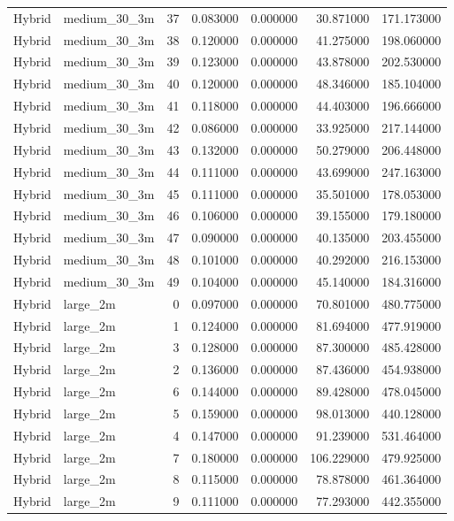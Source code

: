 \begin{tabular}{llrrrrr}
Hybrid & medium_30_3m & 37 & 0.083000 & 0.000000 & 30.871000 & 171.173000 \\
Hybrid & medium_30_3m & 38 & 0.120000 & 0.000000 & 41.275000 & 198.060000 \\
Hybrid & medium_30_3m & 39 & 0.123000 & 0.000000 & 43.878000 & 202.530000 \\
Hybrid & medium_30_3m & 40 & 0.120000 & 0.000000 & 48.346000 & 185.104000 \\
Hybrid & medium_30_3m & 41 & 0.118000 & 0.000000 & 44.403000 & 196.666000 \\
Hybrid & medium_30_3m & 42 & 0.086000 & 0.000000 & 33.925000 & 217.144000 \\
Hybrid & medium_30_3m & 43 & 0.132000 & 0.000000 & 50.279000 & 206.448000 \\
Hybrid & medium_30_3m & 44 & 0.111000 & 0.000000 & 43.699000 & 247.163000 \\
Hybrid & medium_30_3m & 45 & 0.111000 & 0.000000 & 35.501000 & 178.053000 \\
Hybrid & medium_30_3m & 46 & 0.106000 & 0.000000 & 39.155000 & 179.180000 \\
Hybrid & medium_30_3m & 47 & 0.090000 & 0.000000 & 40.135000 & 203.455000 \\
Hybrid & medium_30_3m & 48 & 0.101000 & 0.000000 & 40.292000 & 216.153000 \\
Hybrid & medium_30_3m & 49 & 0.104000 & 0.000000 & 45.140000 & 184.316000 \\
Hybrid & large_2m & 0 & 0.097000 & 0.000000 & 70.801000 & 480.775000 \\
Hybrid & large_2m & 1 & 0.124000 & 0.000000 & 81.694000 & 477.919000 \\
Hybrid & large_2m & 3 & 0.128000 & 0.000000 & 87.300000 & 485.428000 \\
Hybrid & large_2m & 2 & 0.136000 & 0.000000 & 87.436000 & 454.938000 \\
Hybrid & large_2m & 6 & 0.144000 & 0.000000 & 89.428000 & 478.045000 \\
Hybrid & large_2m & 5 & 0.159000 & 0.000000 & 98.013000 & 440.128000 \\
Hybrid & large_2m & 4 & 0.147000 & 0.000000 & 91.239000 & 531.464000 \\
Hybrid & large_2m & 7 & 0.180000 & 0.000000 & 106.229000 & 479.925000 \\
Hybrid & large_2m & 8 & 0.115000 & 0.000000 & 78.878000 & 461.364000 \\
Hybrid & large_2m & 9 & 0.111000 & 0.000000 & 77.293000 & 442.355000 \\

\end{tabular}
